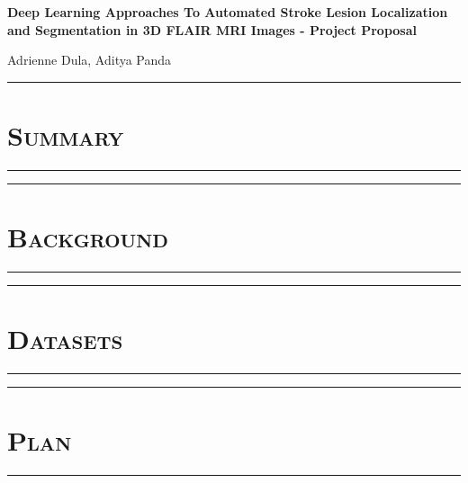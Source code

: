 \documentclass[10pt]{article} %
\begin{document}
\begin{center}
{\bf Deep Learning Approaches To Automated Stroke Lesion Localization and Segmentation in 3D FLAIR MRI Images - Project Proposal} %
\end{center}

\begin{center}
Adrienne Dula, Aditya Panda
\end{center}

\begin{center}
    \par\noindent\rule{\textwidth}{0.2pt}
    \section*{\textsc{\textmd{Summary}}}
    \par\noindent\rule{\textwidth}{0.2pt}
\end{center}


\begin{center}
    \par\noindent\rule{\textwidth}{0.2pt}
    \section*{\textsc{\textmd{Background}}}
    \par\noindent\rule{\textwidth}{0.2pt}
\end{center}


\begin{center}
    \par\noindent\rule{\textwidth}{0.2pt}
    \section*{\textsc{\textmd{Datasets}}}
    \par\noindent\rule{\textwidth}{0.2pt}
\end{center}


\begin{center}
    \par\noindent\rule{\textwidth}{0.2pt}
    \section*{\textsc{\textmd{Plan}}}
    \par\noindent\rule{\textwidth}{0.2pt}
\end{center}

\end{document}
